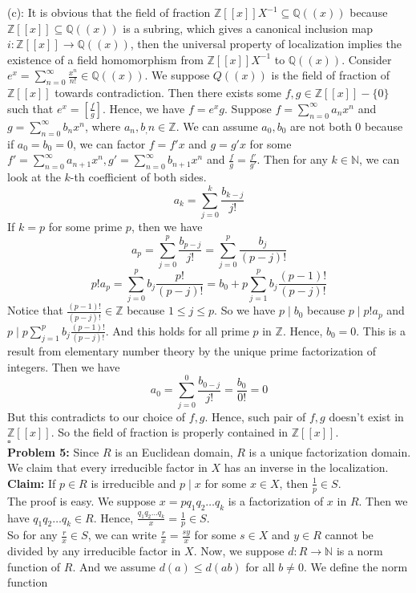 \documentclass[12pt]{amsart}
\newcommand{\Q}{\mathbb{Q}}
\newcommand{\Z}{\mathbb{Z}}
\newcommand{\N}{\mathbb{N}}
\begin{document}
(c): It is obvious that the field of fraction $\Z[[x]]X^{-1}\subseteq \Q((x))$ because $\Z[[x]]\subseteq \Q((x))$ is a subring, which gives a canonical inclusion map $i:\Z[[x]]\to \Q((x))$, then the universal property of localization implies the existence of a field homomorphism from $\Z[[x]]X^{-1}$ to $\Q((x))$. Consider $e^x=\sum_{n=0}^\infty\frac{x^n}{n!}\in \Q((x))$. We suppose $Q((x))$ is the field of fraction of $\Z[[x]]$ towards contradiction. Then there exists some $f,g\in\Z[[x]]-\{0\}$ such that $e^x=[\frac{f}{g}]$. Hence, we have $f=e^xg$. Suppose $f=\sum_{n=0}^\infty a_nx^n$ and $g=\sum_{n=0}^\infty b_nx^n$, where $a_n,b_,n\in\Z$. We can assume $a_0,b_0$ are not both 0 because if $a_0=b_0=0$, we can factor $f=f'x$ and $g=g'x$ for some $f'=\sum_{n=0}^\infty a_{n+1}x^n,g'=\sum_{n=0}^\infty b_{n+1}x^n$ and $\frac{f}{g}=\frac{f'}{g'}$. Then for any $k\in\N$, we can look at the $k$-th coefficient of both sides.
\[a_k=\sum_{j=0}^k \frac{b_{k-j}}{j!}\]
If $k=p$ for some prime $p$, then we have 
\[a_p=\sum_{j=0}^p \frac{b_{p-j}}{j!}=\sum_{j=0}^p \frac{b_{j}}{(p-j)!}\]
\[p!a_p=\sum_{j=0}^p b_{j}\frac{p!}{(p-j)!}=b_0+p\sum_{j=1}^p b_{j}\frac{(p-1)!}{(p-j)!}\]
Notice that $\frac{(p-1)!}{(p-j)!}\in \Z$ because $1\leq j\leq p$. So we have $p\mid b_0$ because $p\mid p!a_p$ and $p\mid p\sum_{j=1}^p b_{j}\frac{(p-1)!}{(p-j)!}$. And this holds for all prime $p$ in $\Z$. Hence, $b_0=0$. This is a result from elementary number theory by the unique prime factorization of integers. Then we have 
\[a_0=\sum_{j=0}^0 \frac{b_{0-j}}{j!}=\frac{b_0}{0!}=0\]
But this contradicts to our choice of $f,g$. Hence, such pair of $f,g$ doesn't exist in $\Z[[x]]$. So the field of fraction is properly contained in $\Z[[x]]$.
\\\phantom{qed}\hfill$\square$\\
\textbf{Problem 5:}
Since $R$ is an Euclidean domain, $R$ is a unique factorization domain. We claim that every irreducible factor in $X$ has an inverse in the localization.\\
\textbf{Claim:} If $p\in R$ is irreducible and $p\mid x$ for some $x\in X$, then $\frac{1}{p}\in S$.\\
The proof is easy. We suppose $x=pq_1q_2\dots q_k$ is a factorization of $x$ in $R$. Then we have $q_1q_2\dots q_k\in R$. Hence, $\frac{q_1q_2\dots q_k}{x}=\frac{1}{p}\in S$.\\
So for any $\frac{r}{x}\in S$, we can write $\frac{r}{x}=\frac{sy}{x}$ for some $s\in X$ and  $y\in R$ cannot be divided by any irreducible factor in $X$.
Now, we suppose $d:R\to \N$ is a norm function of $R$. And we assume $d(a)\leq d(ab)$ for all $b\neq 0$. We define the norm function 
\end{document}
